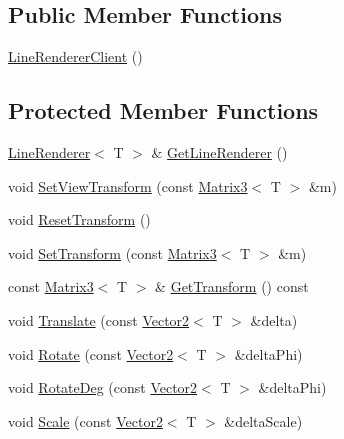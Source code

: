 \subsection*{Public Member Functions}
\begin{DoxyCompactItemize}
\item 
\hyperlink{classastu_1_1suite2d_1_1LineRendererClient_aaa642bb6ae37511a6d337969d2cef4da}{Line\+Renderer\+Client} ()
\end{DoxyCompactItemize}
\subsection*{Protected Member Functions}
\begin{DoxyCompactItemize}
\item 
\hyperlink{classastu_1_1suite2d_1_1LineRenderer}{Line\+Renderer}$<$ T $>$ \& \hyperlink{classastu_1_1suite2d_1_1LineRendererClient_a54c67e38264a5bcad98953f97037e6ce}{Get\+Line\+Renderer} ()
\item 
void \hyperlink{classastu_1_1suite2d_1_1LineRendererClient_a8377c0e0d4427efdedbc4360677bda38}{Set\+View\+Transform} (const \hyperlink{classastu_1_1Matrix3}{Matrix3}$<$ T $>$ \&m)
\item 
void \hyperlink{classastu_1_1suite2d_1_1LineRendererClient_a6970478206086858fdbd3e7f61e58dce}{Reset\+Transform} ()
\item 
void \hyperlink{classastu_1_1suite2d_1_1LineRendererClient_aa53ada81a5ffff517341318588cdf329}{Set\+Transform} (const \hyperlink{classastu_1_1Matrix3}{Matrix3}$<$ T $>$ \&m)
\item 
const \hyperlink{classastu_1_1Matrix3}{Matrix3}$<$ T $>$ \& \hyperlink{classastu_1_1suite2d_1_1LineRendererClient_a55152a0ad8132995d930bb57429b05d3}{Get\+Transform} () const
\item 
void \hyperlink{classastu_1_1suite2d_1_1LineRendererClient_a0cab0b0c3b4666ba9c7cd6fa238a0ec8}{Translate} (const \hyperlink{classastu_1_1Vector2}{Vector2}$<$ T $>$ \&delta)
\item 
void \hyperlink{classastu_1_1suite2d_1_1LineRendererClient_a983316c99756edd2033161b36eec0a4a}{Rotate} (const \hyperlink{classastu_1_1Vector2}{Vector2}$<$ T $>$ \&delta\+Phi)
\item 
void \hyperlink{classastu_1_1suite2d_1_1LineRendererClient_af4c5038b72648837eedc0b564e14665e}{Rotate\+Deg} (const \hyperlink{classastu_1_1Vector2}{Vector2}$<$ T $>$ \&delta\+Phi)
\item 
void \hyperlink{classastu_1_1suite2d_1_1LineRendererClient_a58ef9f84ea71a512f5c1324ee47e40ee}{Scale} (const \hyperlink{classastu_1_1Vector2}{Vector2}$<$ T $>$ \&delta\+Scale)

\end{DoxyCompactItemize}
